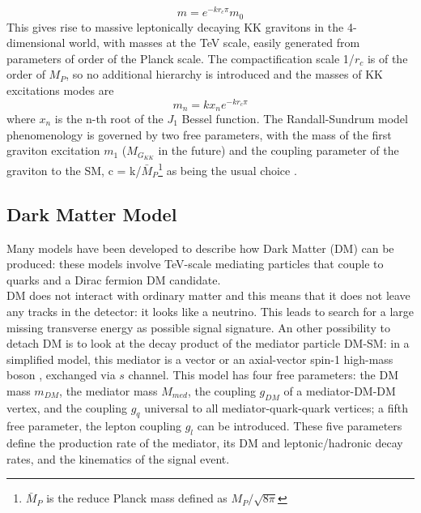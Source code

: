 \[
m = e^{-kr_c\pi}m_0
\]
This gives rise to massive leptonically decaying KK gravitons in the 4- dimensional world, with masses at the TeV scale, easily generated from parameters of order of the Planck scale. The compactification scale 1/$r_c$ is of the order of $M_P$, so no additional hierarchy is introduced and the masses of KK excitations modes are
\[
m_n = kx_ne^{-kr_c\pi}
\]
where $x_n$ is the n-th root of the $J_1$ Bessel function. The Randall-Sundrum model phenomenology is governed by two free parameters, with the mass of the first graviton excitation $m_1$ ($M_{G_{KK}}$ in the future) and the coupling parameter of the graviton to the SM, c = k/$\bar{M}_P$\footnote{$\bar{M}_P$ is the reduce Planck mass defined as $M_P/\sqrt{8\pi}$}
as being the usual choice . 

\subsection{Dark Matter Model}
Many models have been developed to describe how Dark Matter (DM) can be produced: these models involve TeV-scale mediating particles that couple to quarks and a Dirac fermion DM candidate. \\DM does not interact with ordinary matter and this means that it does not leave any tracks in the detector: it looks like a neutrino. This leads to search for a large missing transverse energy as possible signal signature. An other possibility to detach DM is to look at the decay product of the mediator particle DM-SM: in a simplified model, this mediator is a  vector or an axial-vector spin-1 high-mass boson \cite{DarkMatter}, exchanged via $s$ channel. This model has four free parameters: the DM mass $m_{DM}$, the mediator mass $M_{med}$, the coupling $g_{DM}$ of a mediator-DM-DM vertex, and the coupling $g_q$ universal to all mediator-quark-quark vertices; a fifth free parameter, the lepton coupling $g_l$ can be introduced. These five parameters define the production rate of the mediator, its DM and leptonic/hadronic decay rates, and the kinematics of the signal event.  \\







